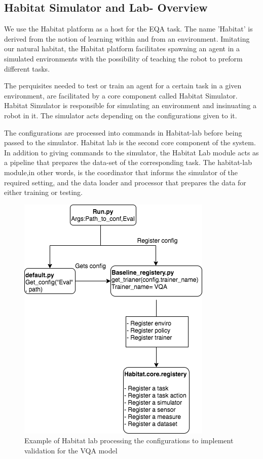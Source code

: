 \subsection{Habitat Simulator and Lab- Overview}

We use the Habitat platform as a host for the EQA task. The name 'Habitat' is derived from  the notion of learning within and from an environment. Imitating our natural habitat, the Habitat platform facilitates spawning an agent in a simulated environments with the possibility of teaching the robot to preform different tasks. 

The perquisites needed to test or train an agent for a certain task in a given environment, are facilitated by a core component called  Habitat Simulator. Habitat Simulator is responsible for simulating an  environment and insinuating a robot in it. The simulator acts depending on the configurations given to it. 

The configurations are processed into commands in Habitat-lab before being passed to the simulator. Habitat lab is the second core component of the system. In addition to giving commands to the simulator, the Habitat Lab module acts as a pipeline that prepares the data-set of the corresponding task. The habitat-lab module,in other words, is the coordinator that informs the simulator of the required setting, and the data loader and processor that prepares the data for either training or testing. 

\begin{figure}[H]
\centering
\includegraphics[scale=0.43]{images/configProcess.png}
\caption{Example of Habitat lab processing the configurations to implement validation for the VQA model }
\label{fig:configs}
\end{figure}

